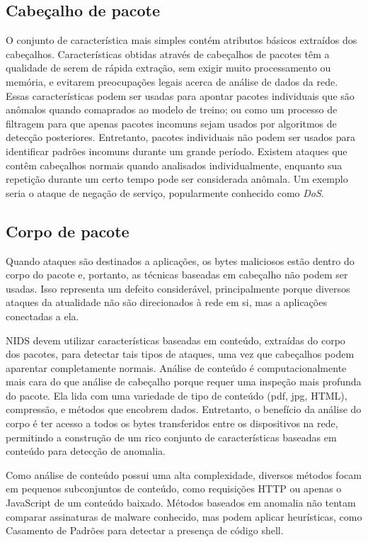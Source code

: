 \subsection{Cabeçalho de pacote}
O conjunto de característica mais simples contém atributos básicos extraídos dos cabeçalhos.
Características obtidas através de  cabeçalhos de pacotes têm a qualidade de serem de rápida extração, sem exigir muito
processamento ou memória, e evitarem preocupações legais acerca de análise de dados da rede.
Essas características podem ser usadas para apontar pacotes individuais que são anômalos quando comaprados ao modelo de
treino; ou como um processo de filtragem para que apenas pacotes incomuns sejam usados por algoritmos de detecção
posteriores.
Entretanto, pacotes individuais não podem ser usados para identificar padrões incomuns durante um grande período.
Existem ataques que contêm cabeçalhos normais quando analisados individualmente, enquanto sua repetição durante
um certo tempo pode ser considerada anômala. Um exemplo seria o ataque de negação de serviço, popularmente conhecido
como \textit{DoS}.

\subsection{Corpo de pacote}
Quando ataques são destinados a aplicações, os bytes maliciosos estão dentro do corpo do
pacote e, portanto, as técnicas baseadas em cabeçalho não podem ser usadas. Isso representa um defeito considerável,
principalmente porque diversos ataques da atualidade não são direcionados à rede em si, mas a aplicações conectadas a
ela.
\par NIDS devem utilizar características baseadas em conteúdo, extraídas do corpo dos pacotes, para detectar tais tipos 
de ataques, uma vez que cabeçalhos podem aparentar completamente normais. Análise de conteúdo é computacionalmente 
mais cara do que análise de cabeçalho porque requer uma inspeção mais profunda do pacote. Ela lida com uma variedade de
tipo de conteúdo (pdf, jpg, HTML), compressão, e métodos que encobrem dados. Entretanto, o benefício da análise do
corpo é ter acesso a todos os bytes transferidos entre os dispositivos na rede, permitindo a construção de um rico
conjunto de características baseadas em conteúdo para detecção de anomalia.
\par Como análise de conteúdo possui uma alta complexidade, diversos métodos focam em pequenos subconjuntos de
conteúdo, como requisições HTTP ou apenas o JavaScript de um conteúdo baixado. Métodos baseados em anomalia não tentam
comparar assinaturas de malware conhecido, mas podem aplicar heurísticas, como Casamento de Padrões para detectar a
presença de código shell.

